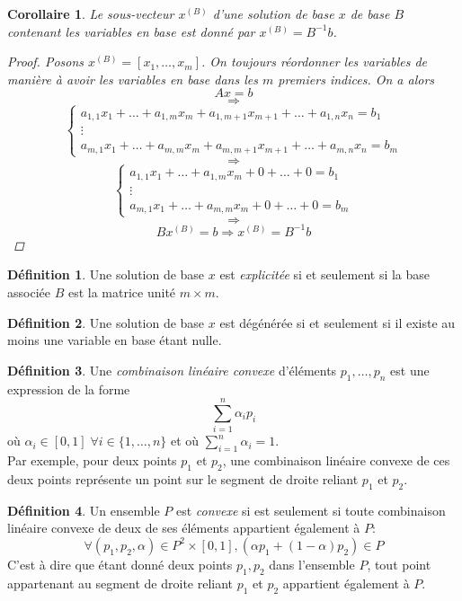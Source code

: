 \documentclass[a4paper]{report}
\theoremstyle{definition}
\newtheorem*{definition}{Définition}
\theoremstyle{remark}
\theoremstyle{plain}
\newtheorem{corollary}{Corollaire}
\begin{document}
\begin{corollary}
Le sous-vecteur \(x^{(B)}\) d'une solution de base \(x\) de base \(B\) contenant
les variables en base est donné par \(x^{(B)}=B^{-1}b\).
\begin{proof}
Posons \(x^{(B)}=[x_1,\dots,x_m]\). On toujours réordonner les variables de
manière à avoir les variables en base dans les \(m\) premiers indices. On a
alors
\[Ax=b\]
\[\Rightarrow\]
\[\begin{cases}
	a_{1,1}x_1+\dots+a_{1,m}x_m+a_{1,m+1}x_{m+1}+\dots+a_{1,n}x_n=b_1\\
	\vdots\\
	a_{m,1}x_1+\dots+a_{m,m}x_m+a_{m,m+1}x_{m+1}+\dots+a_{m,n}x_n=b_m
\end{cases}\]
\[\Rightarrow\]
\[\begin{cases}
	a_{1,1}x_1+\dots+a_{1,m}x_m+0+\dots+0=b_1\\
	\vdots\\
	a_{m,1}x_1+\dots+a_{m,m}x_m+0+\dots+0=b_m
\end{cases}\]
\[\Rightarrow\]
\[Bx^{(B)}=b\Rightarrow x^{(B)}=B^{-1}b\]
\end{proof}
\end{corollary}

\begin{definition}
Une solution de base \(x\) est \emph{explicitée} si et
seulement si la base associée \(B\) est la matrice unité \(m\times m\).
\end{definition}

\begin{definition}
Une solution de base \(x\) est dégénérée si et seulement si il existe au moins
une variable en base étant nulle.
\end{definition}

\begin{definition}
Une \emph{combinaison linéaire convexe} d'éléments \(p_1,\dots,p_n\) est
une expression de la forme \[\sum_{i=1}^n\alpha_ip_i\] où \(\alpha_i\in[0,1]
\;\forall i\in\{1,\dots,n\}\) et où \(\sum_{i=1}^n\alpha_i=1\). \\
Par exemple, pour deux points \(p_1\) et \(p_2\), une combinaison linéaire
convexe de ces deux points représente un point sur le segment de droite reliant
\(p_1\) et \(p_2\).
\end{definition}

\begin{definition}
Un ensemble \(P\) est \emph{convexe} si est seulement si toute combinaison
linéaire convexe de deux de ses éléments appartient également à \(P\):
\[\forall (p_1, p_2,\alpha)\in P^2\times[0,1],(\alpha p_1+(1-\alpha)p_2)\in P\]
C'est à dire que étant donné deux points \(p_1,p_2\) dans l'ensemble \(P\),
tout point appartenant au segment de droite reliant \(p_1\) et \(p_2\)
appartient également à \(P\).
\end{definition}
\end{document}
